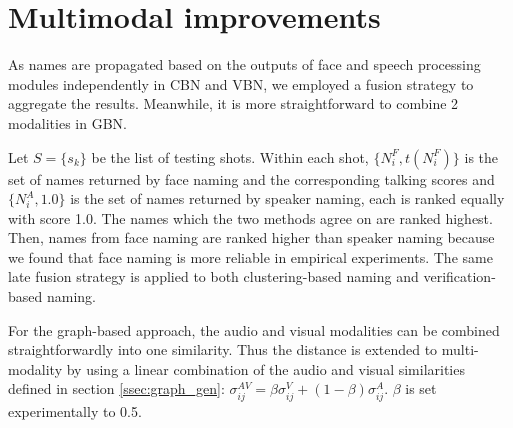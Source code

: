 \section{Multimodal improvements}
\label{sec:naming}

As names are propagated based on the outputs of face and speech processing modules independently in CBN and VBN, we employed a fusion strategy to aggregate the results. Meanwhile, it is more straightforward to combine 2 modalities in GBN.


Let $S = \{s_k\}$ be the list of testing shots. Within each shot, $\{N^F_i, t(N^F_i)\}$ is the set of names returned by face naming and the corresponding talking scores and $\{N^A_i, 1.0\}$  is the set of names returned by speaker naming, each is ranked equally with score 1.0.
%
The names which the two methods agree on are ranked highest. 
%
Then, names from face naming are ranked higher than speaker naming  because we found that face naming is more reliable in empirical experiments.
%
%
The same late fusion strategy is applied to both clustering-based naming and verification-based naming.


For the graph-based approach, the audio and visual modalities can be combined straightforwardly into one similarity.
%
Thus the distance is extended to multi-modality by using a linear combination of the audio and visual similarities defined in section \ref{ssec:graph_gen}: $\sigma^{AV}_{ij} = \beta \sigma^V_{ij} + (1-\beta) \sigma^A_{ij}$. $\beta$ is set experimentally to 0.5.

\endinput

\begin{algorithm}
  \caption{Ranking names within shots
    \label{algo:ranking}}
  \begin{algorithmic}[1]
	  \For{$s_k \in S$}
 	  	    \State{$Q_{s_k} = \emptyset$}
		    \State{Face\_naming$(s_k) \Rightarrow (N^F_i, t(N^F_i))$}
				\State{Speaker\_naming$(s_k) \Rightarrow (N^A_j, 1.0)$}
				\For{each $N^F_i$}
					\If{$\exists N^A_j / N^A_j = N^F_i$}
						\State{$Q_{s_k} = Q_{s_k} \cup \{(N^F_i, t(N^F_i) + 2.0)\}$}
					\Else
						\State{$Q_{s_k} = Q_{s_k} \cup \{(N^F_i, t(N^F_i) + 1.0)\}$}
					\EndIf
				\EndFor
				\For{each $N^A_j$}
					\If{not $\exists N^F_i / N^F_i = N^A_j$}
						\State{$Q_{s_k} = Q_{s_k} \cup \{(N^A_j, 1.0)\}$}
					\EndIf
				\EndFor
		\EndFor
  \end{algorithmic}
\end{algorithm}
%